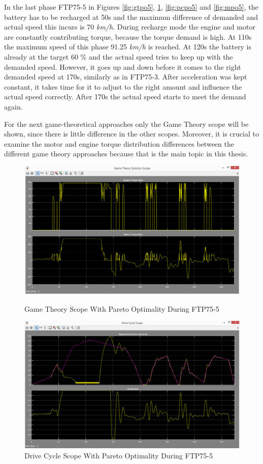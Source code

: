In the last phase FTP75-5 in Figures \ref{fig:gtpo5}, \ref{fig:dcpo5}, \ref{fig:pcpo5} and \ref{fig:mpo5}, the battery has to be recharged at 50s and the maximum difference of demanded and actual speed this incurs is 70 \textit{km/h}. During recharge mode the engine and motor are constantly contributing torque, because the torque demand is high. At 110s the maximum speed of this phase 91.25 \textit{km/h} is reached. At 120s the battery is already at the target 60 \% and the actual speed tries to keep up with the demanded speed. However, it goes up and down before it comes to the right demanded speed at 170s, similarly as in FTP75-3. After acceleration was kept constant, it takes time for it to adjust to the right amount and influence the actual speed correctly. After 170s the actual speed starts to meet the demand again. 

For the next game-theoretical approaches only the Game Theory scope will be shown, since there is little difference in the other scopes. Moreover, it is crucial to examine the motor and engine torque distribution differences between the different game theory approaches because that is the main topic in this thesis.

\begin{figure}[hp]
\centering
\includegraphics[scale=0.46]{figures/Pareto/FTP75-5/gameTheory05Juli}
\caption{Game Theory Scope With Pareto Optimality During FTP75-5}
\label{fig:gtpo5}
\includegraphics[scale=0.44]{figures/Pareto/FTP75-5/driveCycle05Juli}
\caption{Drive Cycle Scope With Pareto Optimality During FTP75-5}
\label{fig:dcpo5}
\end{figure}


